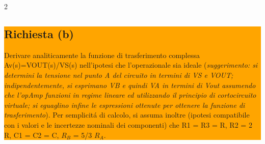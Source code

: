 \begin{multicols}{2}
  \noindent\colorbox{orange}{
    \begin{minipage}{0.9\linewidth}
      \subsection*{Richiesta (b)}
      Derivare analiticamente la funzione di trasferimento complessa Av(s)=VOUT(s)/VS(s)
      nell’ipotesi che l’operazionale sia ideale (\textit{suggerimento: si determini la tensione nel
        punto A del circuito in termini di VS e VOUT; indipendentemente, si esprimano VB e quindi
        VA in termini di Vout assumendo che l'opAmp funzioni in regime lineare ed utilizzando il
        principio di cortocircuito virtuale; si eguaglino infine le espressioni ottenute per ottenere
        la funzione di trasferimento}). Per semplicit\'a di calcolo, si assuma inoltre (ipotesi
      compatibile con i valori e le incertezze nominali dei componenti) che R1 = R3 = R, R2 =
      2 R, C1 = C2 = C, $R_B$ = 5/3 $R_A$.
    \end{minipage}
  }

\end{multicols}
